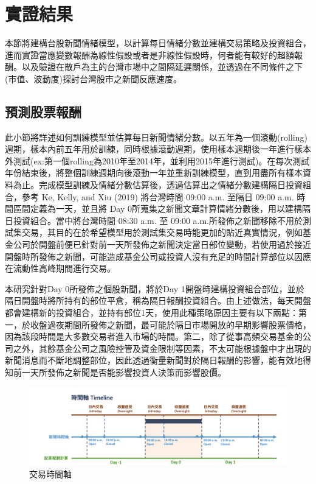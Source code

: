 \section{實證結果}
本節將建構台股新聞情緒模型，以計算每日情緒分數並建構交易策略及投資組合，進而實證當應變數報酬為線性假設或者是非線性假設時，何者能有較好的超額報酬。以及驗證在散戶為主的台灣市場中之間隔延遲關係，並透過在不同條件之下(市值、波動度)探討台灣股市之新聞反應速度。
\subsection{預測股票報酬}
此小節將詳述如何訓練模型並估算每日新聞情緒分數。以五年為一個滾動(rolling)週期，樣本內前五年用於訓練，同時根據滾動週期，使用樣本週期後一年進行樣本外測試(ex:第一個rolling為2010年至2014年，並利用2015年進行測試)。在每次測試年份結束後，將整個訓練週期向後滾動一年並重新訓練模型，直到用盡所有樣本資料為止。完成模型訓練及情緒分數估算後，透過估算出之情緒分數建構隔日投資組合，參考 Ke, Kelly, and Xiu (2019) 將台灣時間 09:00 a.m. 至隔日 09:00 a.m. 時間區間定義為一天，並且將 Day 0所蒐集之新聞文章計算情緒分數後，用以建構隔日投資組合。當中將台灣時間 08:30 a.m. 至 09:00 a.m.所發佈之新聞移除不用於測試集交易，其目的在於希望模型用於測試集交易時能更加的貼近真實情況，例如基金公司於開盤前便已針對前一天所發佈之新聞決定當日部位變動，若使用過於接近開盤時所發佈之新聞，可能造成基金公司或投資人沒有充足的時間計算部位以因應在流動性高峰期間進行交易。

本研究針對Day 0所發佈之個股新聞，將於Day 1開盤時建構投資組合部位，並於隔日開盤時將所持有的部位平倉，稱為隔日報酬投資組合。由上述做法，每天開盤都會建構新的投資組合，並持有部位1天，使用此種策略原因主要有以下兩點：第一，於收盤過夜期間所發佈之新聞，最可能於隔日市場開放的早期影響股票價格，因為該段時間是大多數交易者進入市場的時間。第二，除了從事高頻交易基金的公司之外，其餘基金公司之風險控管及資金限制等因素，不太可能根據盤中才出現的新聞消息而不斷地調整部位，因此透過衡量新聞對於隔日報酬的影響，能有效地得知前一天所發佈之新聞是否能影響投資人決策而影響股價。

\begin{figure}[htbp]
\centering
\includegraphics[width=1.1\textwidth]{images/times.png}
\caption{交易時間軸}
\end{figure}


